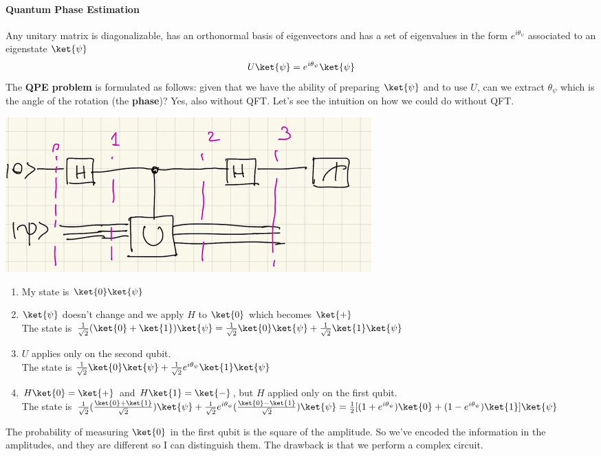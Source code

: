 \documentclass[10pt]{report}
\begin{document}
\paragraph{Quantum Phase Estimation} Any unitary matrix is diagonalizable, has an orthonormal basis of eigenvectors and has a set of eigenvalues in the form $e^{i\theta_\psi}$ associated to an eigenstate $\ket{\psi}$
$$U\ket{\psi} = e^{i\theta_\psi}\ket{\psi}$$
The \textbf{QPE problem} is formulated as follows: given that we have the ability of preparing $\ket{\psi}$ and to use $U$, can we extract $\theta_\psi$ which is the angle of the rotation (the \textbf{phase})? Yes, also without QFT. Let's see the intuition on how we could do without QFT.
\begin{center}
	\includegraphics[scale=0.5]{27.png}
\end{center}
\begin{enumerate}
	\item My state is $\ket{0}\ket{\psi}$
	\item $\ket{\psi}$ doesn't change and we apply $H$ to $\ket{0}$ which becomes $\ket{+}$\\
	The state is $\frac{1}{\sqrt{2}}(\ket{0}+\ket{1})\ket{\psi} = \frac{1}{\sqrt{2}}\ket{0}\ket{\psi} + \frac{1}{\sqrt{2}}\ket{1}\ket{\psi}$
	\item $U$ applies only on the second qubit.\\
	The state is $\frac{1}{\sqrt{2}}\ket{0}\ket{\psi} + \frac{1}{\sqrt{2}}e^{i\theta_\psi}\ket{1}\ket{\psi}$
	\item $H\ket{0} = \ket{+}$ and $H\ket{1} = \ket{-}$, but $H$ applied only on the first qubit.\\
	The state is $\frac{1}{\sqrt{2}}(\frac{\ket{0}+\ket{1}}{\sqrt{2}})\ket{\psi} + \frac{1}{\sqrt{2}}e^{i\theta_\psi}(\frac{\ket{0}-\ket{1}}{\sqrt{2}})\ket{\psi} = \frac{1}{2}[(1+e^{i\theta_\psi})\ket{0} + (1-e^{i\theta_\psi})\ket{1}]\ket{\psi}$
\end{enumerate}
The probability of measuring $\ket{0}$ in the first qubit is the square of the amplitude. So we've encoded the information in the amplitudes, and they are different so I can distinguish them. The drawback is that we perform a complex circuit.\\\\
\end{document}
